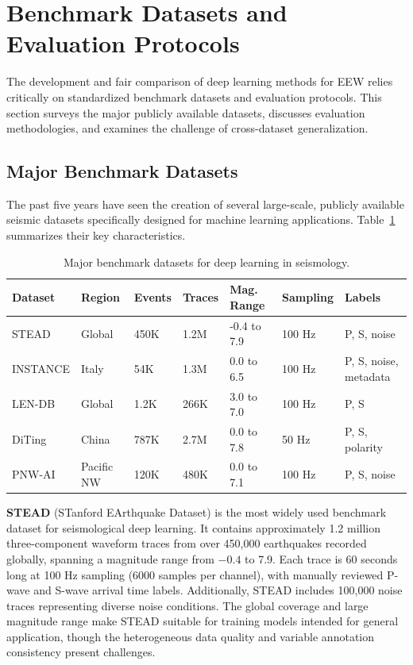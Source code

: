 \documentclass[review,authoryear]{elsarticle}
\begin{document}
\section{Benchmark Datasets and Evaluation Protocols}
\label{sec:datasets}

The development and fair comparison of deep learning methods for EEW relies critically on standardized benchmark datasets and evaluation protocols. This section surveys the major publicly available datasets, discusses evaluation methodologies, and examines the challenge of cross-dataset generalization.

\subsection{Major Benchmark Datasets}

The past five years have seen the creation of several large-scale, publicly available seismic datasets specifically designed for machine learning applications. Table~\ref{tab:datasets} summarizes their key characteristics.

\begin{table}[H]
\centering
\caption{Major benchmark datasets for deep learning in seismology.}
\label{tab:datasets}
\small
\begin{tabular}{p{2.0cm}p{1.5cm}p{1.5cm}p{1.5cm}p{2.0cm}p{1.5cm}p{2.5cm}}
\toprule
\textbf{Dataset} & \textbf{Region} & \textbf{Events} & \textbf{Traces} & \textbf{Mag. Range} & \textbf{Sampling} & \textbf{Labels} \\
\midrule
STEAD & Global & 450K & 1.2M & -0.4 to 7.9 & 100 Hz & P, S, noise \\
INSTANCE & Italy & 54K & 1.3M & 0.0 to 6.5 & 100 Hz & P, S, noise, metadata \\
LEN-DB & Global & 1.2K & 266K & 3.0 to 7.0 & 100 Hz & P, S \\
DiTing & China & 787K & 2.7M & 0.0 to 7.8 & 50 Hz & P, S, polarity \\
PNW-AI & Pacific NW & 120K & 480K & 0.0 to 7.1 & 100 Hz & P, S, noise \\
\bottomrule
\end{tabular}
\end{table}

\textbf{STEAD} (STanford EArthquake Dataset) \citep{mousavi2019stead} is the most widely used benchmark dataset for seismological deep learning. It contains approximately 1.2 million three-component waveform traces from over 450,000 earthquakes recorded globally, spanning a magnitude range from $-0.4$ to 7.9. Each trace is 60 seconds long at 100 Hz sampling (6000 samples per channel), with manually reviewed P-wave and S-wave arrival time labels. Additionally, STEAD includes 100,000 noise traces representing diverse noise conditions. The global coverage and large magnitude range make STEAD suitable for training models intended for general application, though the heterogeneous data quality and variable annotation consistency present challenges.
\end{document}
